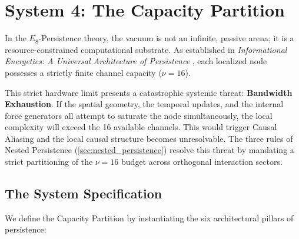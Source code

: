 \section{System 4: The Capacity Partition}
\label{sec:capacity_partition}

In the $E_8$-Persistence theory, the vacuum is not an infinite, passive arena; it is a resource-constrained computational substrate. As established in \textit{Informational Energetics: A Universal Architecture of Persistence} \cite{meyer_informational_2026}, each localized node possesses a strictly finite channel capacity ($\nu = 16$). 

This strict hardware limit presents a catastrophic systemic threat: \textbf{Bandwidth Exhaustion}. If the spatial geometry, the temporal updates, and the internal force generators all attempt to saturate the node simultaneously, the local complexity will exceed the 16 available channels. This would trigger Causal Aliasing and the local causal structure becomes unresolvable. The three rules of Nested Persistence (\cref{sec:nested_persistence}) resolve this threat by mandating a strict partitioning of the $\nu = 16$ budget across orthogonal interaction sectors.

\subsection{The System Specification}

We define the Capacity Partition by instantiating the six architectural pillars of persistence:

